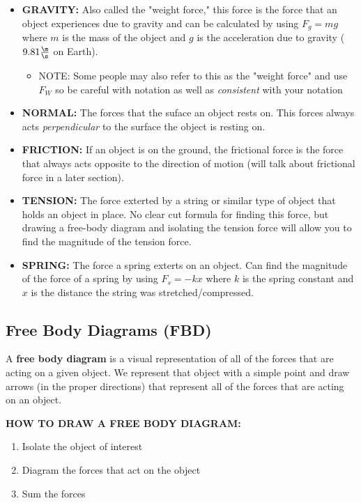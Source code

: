 \begin{itemize}
	\item \textbf{GRAVITY:} Also called the "weight force," this force is the force that an object experiences due to gravity and can be calculated by using $F_g = mg$ where $m$ is the mass of the object and $g$ is the acceleration due to gravity ($9.81\frac{\m}{\s}$ on Earth).
	\begin{itemize}
		\item NOTE: Some people may also refer to this as the "weight force" and use $F_W$ so be careful with notation as well as \textit{consistent} with your notation
	\end{itemize}
	\item \textbf{NORMAL:} The forces that the suface an object rests on. This forces always acts \textit{perpendicular} to the surface the object is resting on.
	\item \textbf{FRICTION:} If an object is on the ground, the frictional force is the force that always acts opposite to the direction of motion (will talk about frictional force in a later section).
	\item \textbf{TENSION:} The force exterted by a string or similar type of object that holds an object in place. No clear cut formula for finding this force, but drawing a free-body diagram and isolating the tension force will allow you to find the magnitude of the tension force. 
	\item \textbf{SPRING:} The force a spring exterts on an object. Can find the magnitude of the force of a spring by using $F_s = -kx$ where $k$ is the spring constant and $x$ is the distance the string was stretched/compressed.
\end{itemize}


\subsection{Free Body Diagrams (FBD)}

A \textbf{free body diagram} is a visual representation of all of the forces that are acting on a given object. We represent that object with a simple point and draw arrows (in the proper directions) that represent all of the forces that are acting on an object.\\

\begin{center}\textbf{HOW TO DRAW A FREE BODY DIAGRAM:}\end{center}
\begin{enumerate}
	\item Isolate the object of interest
	\item Diagram the forces that act on the object
	\item Sum the forces
\end{enumerate}

